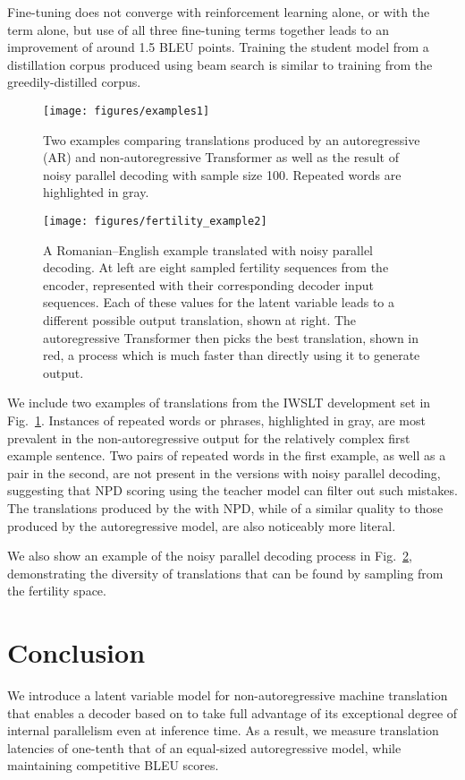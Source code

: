 \documentclass{article} \usepackage{iclr2018_conference,times}
\begin{document}
Fine-tuning does not converge with reinforcement learning alone, or with the  term alone, but use of all three fine-tuning terms together leads to an improvement of around 1.5 BLEU points. Training the student model from a distillation corpus produced using beam search is similar to training from the greedily-distilled corpus.

\begin{figure}[htpb]
\texttt{[image: figures/examples1]}
\caption{\label{fig.ex} Two examples comparing translations produced by an autoregressive (AR) and non-autoregressive Transformer as well as the result of noisy parallel decoding with sample size 100. Repeated words are highlighted in gray.}
\end{figure}
\begin{figure}[htpb]
\centering
\texttt{[image: figures/fertility\_example2]}
\caption{\label{fig.fer} A Romanian--English example translated with noisy parallel decoding. At left are eight sampled fertility sequences from the encoder, represented with their corresponding decoder input sequences. Each of these values for the latent variable leads to a different possible output translation, shown at right. The autoregressive Transformer then picks the best translation, shown in red, a process which is much faster than directly using it to generate output.}
\end{figure}

We include two examples of translations from the IWSLT development set in Fig.~\ref{fig.ex}.
Instances of repeated words or phrases, highlighted in gray, are most prevalent in the non-autoregressive output for the relatively complex first example sentence. Two pairs of repeated words in the first example, as well as a pair in the second, are not present in the versions with noisy parallel decoding, suggesting that NPD scoring using the teacher model can filter out such mistakes. The translations produced by the \model{} with NPD, while of a similar quality to those produced by the autoregressive model, are also noticeably more literal. 

We also show an example of the noisy parallel decoding process in Fig.~\ref{fig.fer}, demonstrating the diversity of translations that can be found by sampling from the fertility space.

\section{Conclusion}
We introduce a latent variable model for non-autoregressive machine translation that enables a decoder based on \citet{vaswani2017attention} to take full advantage of its exceptional degree of internal parallelism even at inference time. As a result, we measure translation latencies of one-tenth that of an equal-sized autoregressive model, while maintaining competitive BLEU scores.
\end{document}
